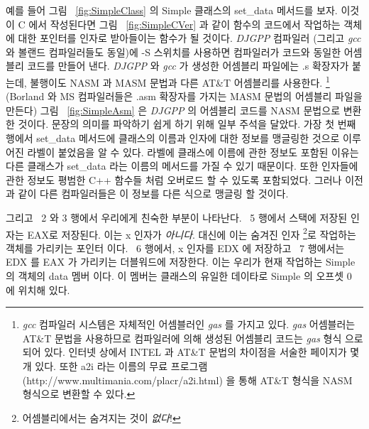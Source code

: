 예를 들어 그림 ~\ref{fig:SimpleClass} 의 {\code Simple} 클래스의 {\code set\_data} 메서드를
보자. 이것이 C 에서 작성된다면 그림 ~\ref{fig:SimpleCVer} 과 같이 함수의 코드에서 작업하는
객체에 대한 포인터를 인자로 받아들이는 함수가 될 것이다. \emph{DJGPP} 컴파일러 (그리고 
\emph{gcc} 와 볼랜드 컴파일러들도 동일)에 {\code -S} 스위치를 사용하면 컴파일러가 코드와
동일한 어셈블리 코드를 만들어 낸다. \emph{DJGPP} 와 \emph{gcc} 가 생성한 어셈블리 파일에는
{\code .s} 확장자가 붙는데, 불행이도 NASM 과 MASM 문법과 다른 AT\&T 어셈블리를 사용한다. 
\footnote{\emph{gcc} 컴파일러 시스템은 자체적인 어셈블러인 \emph{gas}  를 가지고 있다.
\emph{gas} 어셈블러는 AT\&T 문법을 사용하므로 컴파일러에 의해 생성된 어셈블리 코드는 \emph{gas} 형식
으로 되어 있다. 인터넷 상에서 INTEL 과 AT\&T 문법의 차이점을 서술한 페이지가 몇 개 있다. 
또한 {\code a2i} 라는 이름의 무료 프로그램 ({http://www.multimania.com/placr/a2i.html}) 을 통해
AT\&T 형식을 NASM 형식으로 변환할 수 있다.} (Borland 와 MS 컴파일러들은 {\code .asm} 확장자를 가지는
MASM 문법의 어셈블리 파일을 만든다) 그림 ~\ref{fig:SimpleAsm} 은 \emph{DJGPP} 의 어셈블리 코드를
NASM 문법으로 변환한 것이다. 문장의 의미를 파악하기 쉽게 하기 위해 일부 주석을 달았다. 가장
첫 번째 행에서 {\code set\_data} 메서드에 클래스의 이름과 인자에 대한 정보를 맹글링한 것으로 이루어진
라벨이 붙었음을 알 수 있다. 라벨에 클래스에 이름에 관한 정보도 포함된 이유는 다른 클래스가
{\code set\_data} 라는 이름의 메서드를 가질 수 있기 때문이다. 또한 인자들에 관한 정보도 평범한 C++ 함수들
처럼 오버로드 할 수 있도록 포함되었다. 그러나 이전과 같이 다른 컴파일러들은 이 정보를 다른 식으로
맹글링 할 것이다. 

그리고 ~2 와 3 행에서 우리에게 친숙한 부분이 나타난다. ~5 행에서 스택에 저장된 인자는 {\code EAX}로 저장된다.
이는 {\code x} 인자가 \emph{아니다}. 대신에 이는 숨겨진 인자 \footnote{어셈블리에서는 숨겨지는 것이 \emph{없다}!}로
작업하는 객체를 가리키는 포인터 이다. ~6 행에서, {\code x} 인자를 {\code EDX} 에 저장하고 ~7 행에서는 {\code EDX} 를 
{\code EAX} 가 가리키는 더블워드에 저장한다. 이는 우리가 현재 작업하는 {\code Simple} 의 객체의 {\code data} 멤버 이다. 
이 멤버는 클래스의 유일한 데이타로 {\code Simple} 의 오프셋 0 에 위치해 있다. 

